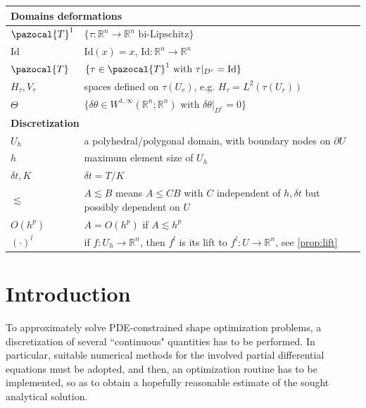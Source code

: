 \documentclass[english,a4paper,9pt,oneside]{scrbook}	%
\theoremstyle{break}
\theoremstyle{remark}
\newcommand{\mR}{\mathbb{R}}
\newcommand{\cT}{\pazocal{T}}
\newcommand{\id}{\text{Id}}
\newcommand{\te}{\theta}
\newcommand{\Te}{\Theta}
\begin{document}
\begin{longtable}{|l|l|}
\multicolumn{2}{|l|}{\textbf{Domains deformations}}    \\ 
\hline
$\cT^1$ & $\{\tau: \mR^n\rightarrow\mR^n \text{ bi-Lipschitz}\}$                  \\ 
\hline
$\id$ & $\id(x)=x$, $\id:\mR^n\rightarrow\mR^n$                  \\ 
\hline
$\cT$ & $\{\tau \in \cT^1 \text{ with } \tau|_{D^c}=\id\}$                  \\ 
\hline
$H_\tau, V_\tau$ & spaces defined on $\tau(U_r)$, e.g. $H_\tau = L^2(\tau(U_r))$                       \\ 
\hline
$\Te$ & $\{\delta \te \in W^{1,\infty}(\mR^n;\mR^n) \text{ with } \delta \te|_{D^c}=0\}$                       \\ 
\hline

\multicolumn{2}{|l|}{\textbf{Discretization}}    \\ 
\hline
$U_h$ & a polyhedral/polygonal domain, with boundary nodes on $\partial U$                  \\ 
\hline
$h$ & maximum element size of $U_h$                  \\ 
\hline
$\delta t, K$      & $\delta t = T/K$            \\ 
\hline
$\lesssim$ & $A\lesssim B$ means $A\leq CB$ with $C$ independent of $h, \delta t$ but possibly dependent on $U$                       \\ 
\hline
$O(h^p)$ & $A=O(h^p)$ if $A\lesssim h^p$ \\ 
\hline
$(\cdot)^l$ & if $f:U_h\rightarrow\mR^n$, then $f^l$ is its lift to $f^l: U \rightarrow \mR^n$, see \cref{prop:lift} \\ 
\hline

\end{longtable}

\chapter{Introduction}  \setcounter{page}{1}   %

To approximately solve PDE-constrained shape optimization problems, a discretization of several ``continuous" quantities has to be performed. In particular, suitable numerical methods for the involved partial differential equations must be adopted, and then, an optimization routine has to be implemented, so as to obtain a hopefully reasonable estimate of the sought analytical solution.
\end{document}
